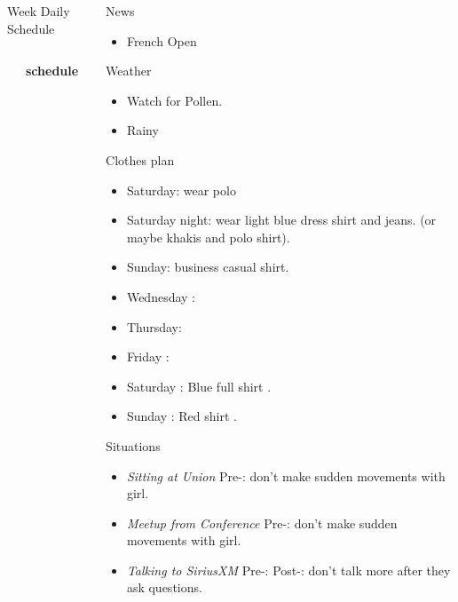 \documentclass[serif, mathserif, final]{beamer}
\begin{document}
\begin{frame}{}
\begin{columns}
\begin{column}{0.50\linewidth}
\begin{block}{Week Daily Schedule}
\begin{columns}
\begin{itemize}
  \end{itemize}
  \textbf{\small schedule}\\
  \begin{enumerate} 
    \tiny \item \tiny 
  \end{enumerate} 
    \end{columns}
  \end{block}
\end{column}%

\begin{column}{0.20\linewidth}
  \begin{block}{News}
    \begin{itemize} 
      \tiny \item \tiny French Open
    \end{itemize}
  \end{block}
  \begin{block}{Weather} 
    \begin{itemize}
      \tiny \item \tiny Watch for Pollen.
    \item \tiny Rainy 
    \end{itemize}
  \end{block} 
  \begin{block}{Clothes plan} 
    \begin{itemize} 
      \tiny \item \tiny Saturday: wear polo 
    \item \tiny Saturday night: wear light blue dress shirt and jeans. (or maybe khakis and polo shirt). 
    \item \tiny Sunday: business casual shirt. 
    \item \tiny Wednesday : 
    \item \tiny Thursday: 
    \item \tiny Friday : 
    \item \tiny Saturday : Blue full shirt . 
    \item \tiny Sunday : Red shirt .
    \end{itemize} 
  \end{block}

  \begin{block}{Situations}
    \begin{itemize}
\tiny \item \tiny \textit{Sitting at Union} Pre-: don't make
        sudden movements with girl.
      \item \tiny \textit{Meetup from Conference} Pre-: don't make
        sudden movements with girl.  
        \item \tiny \textit{Talking to SiriusXM} Pre-:  Post-: don't
          talk more after they ask questions.  


\end{itemize}
\end{block}
\end{column}
\end{columns}
\end{frame}
\end{document}
